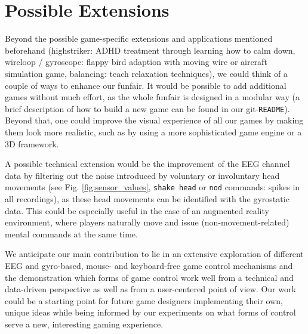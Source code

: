 \documentclass{utue} %
\begin{document}
\section{Possible Extensions}

Beyond the possible game-specific extensions and applications mentioned beforehand (highstriker: ADHD treatment through learning how to calm down, wireloop / gyroscope: flappy bird adaption with moving wire or aircraft simulation game, balancing: teach relaxation techniques), we could think of a couple of ways to enhance our funfair. It would be possible to add additional games without much effort, as the whole funfair is designed in a modular way (a brief description of how to build a new game can be found in our git-\texttt{README}). Beyond that, one could improve the visual experience of all our games by making them look more realistic, such as by using a more sophisticated game engine or a 3D framework.

A possible technical extension would be the improvement of the EEG channel data by filtering out the noise introduced by voluntary or involuntary head movements (see Fig. \ref{fig:sensor_values}, \texttt{shake head} or \texttt{nod} commands: spikes in all recordings), as these head movements can be identified with the gyrostatic data. This could be especially useful in the case of an augmented reality environment, where players naturally move and issue (non-movement-related) mental commands at the same time.

We anticipate our main contribution to lie in an extensive exploration of different EEG and gyro-based, mouse- and keyboard-free game control mechanisms and the demonstration which forms of game control work well from a technical and data-driven perspective as well as from a user-centered point of view. Our work could be a starting point for future game designers implementing their own, unique ideas while being informed by our experiments on what forms of control serve a new, interesting gaming experience.



\end{document}
